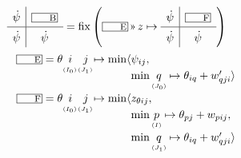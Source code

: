 \begin{equation}
  \renewcommand\arraystretch{1.2}
  \begin{array}{r @{} l @{} c @{} c @{} l @{} l}
    \lspan6{
    \quadrants{\dot\psi}{\lbox B}{\dot\psi}{\dot\psi} =
      \fix\left(\lbox E \applt z\mapsto\quadrants{\dot\psi}{\lbox F}{\dot\psi}{\dot\psi}\right) 
    } \\[1.5em]
    ~\lbox E ={} &
      \theta & i & j & \mapsto\min\langle & \psi_{ij}, \\
             & & ^{^{(I_0)}} & ^{^{(J_1)}} &
                                          & \min \vtyped q{J_0}\mapsto\theta_{iq}+w'_{qji} \rangle \\
    ~\lbox F ={} &
      \theta & i & j & \mapsto\min\langle & z_{\theta ij}, \\
             & & ^{^{(I_0)}} & ^{^{(J_1)}} &
                                         & \min \vtyped p I \mapsto\theta_{pj}+w_{pij}, \\
             & & & &                     & \min \vtyped q {J_1} \mapsto\theta_{iq}+w'_{qji}\rangle
  \end{array}
\end{equation}


